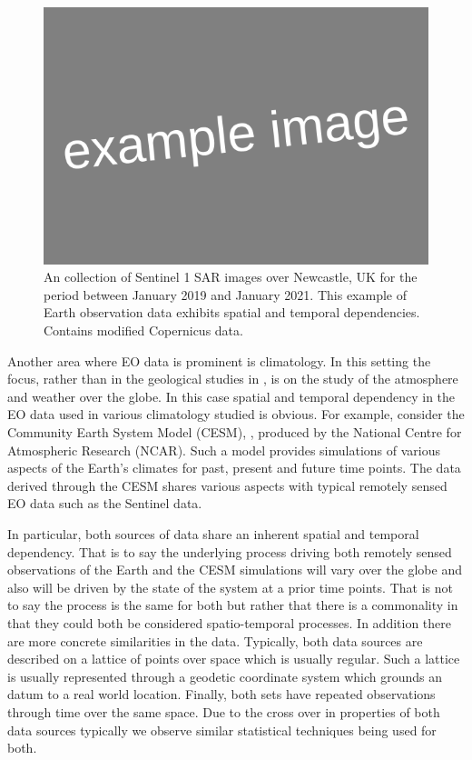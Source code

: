 \begin{figure}[htbp!] 
	\centering    
	\includegraphics[width=1.0\textwidth]{Example_image}
	\caption[Sentinel 1 SAR image time series.]{An collection of Sentinel 1 SAR images over Newcastle, UK for the period between January 2019 and January 2021.   This example of Earth observation data exhibits spatial and temporal dependencies. Contains modified Copernicus data.}
	\label{fig:example_st}
\end{figure}

Another area where EO data is prominent is climatology. In this setting the focus, rather than in the geological studies in \citep{muro_short-term_2016, khabbazan_crop_2019, raspini_continuous_2018}, is on the study of the atmosphere and weather over the globe. In this case spatial and temporal dependency in the EO data used in various climatology studied is obvious. For example, consider the Community Earth System Model (CESM), \citep{kay_community_2015}, produced by the National Centre for Atmospheric Research (NCAR). Such a model provides simulations of various aspects of the Earth's climates for past, present and future time points. The data derived through the CESM shares various aspects with typical remotely sensed EO data such as the Sentinel data. 

In particular, both sources of data share an inherent spatial and temporal dependency. That is to say the underlying process driving both remotely sensed observations of the Earth and the CESM simulations will vary over the globe and also will be driven by the state of the system at a prior time points. That is not to say the process is the same for both but rather that there is a commonality in that they could both be considered spatio-temporal processes. In addition there are more concrete similarities in the data. Typically, both data sources are described on a lattice of points over space which is usually regular. Such a lattice is usually represented through a geodetic coordinate system which grounds an datum to a real world location. Finally, both sets have repeated observations through time over the same space. Due to the cross over in properties of both data sources typically we observe similar statistical techniques being used for both. 


